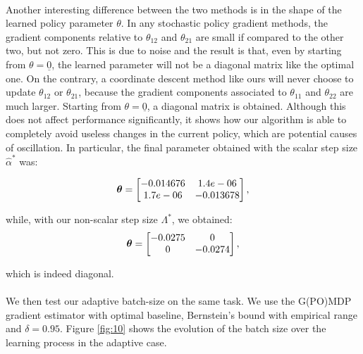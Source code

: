 \paragraph{}
Another interesting difference between the two methods is in the shape of the learned policy parameter $\theta$. In any stochastic policy gradient methods, the gradient components relative to $\theta_{12}$ and $\theta_{21}$ are small if compared to the other two, but not zero. This is due to noise and the result is that, even by starting from $\theta = \underline{0}$, the learned parameter will not be a diagonal matrix like the optimal one. On the contrary, a coordinate descent method like ours will never choose to update $\theta_{12}$ or $\theta_{21}$, because the gradient components associated to $\theta_{11}$ and $\theta_{22}$ are much larger. Starting from $\theta = \underline{0}$, a diagonal matrix is obtained.
Although this does not affect performance significantly, it shows how our algorithm is able to completely avoid useless changes in the current policy, which are potential causes of oscillation. In particular, the final parameter obtained with the scalar step size $\hat{\alpha}^*$ was:

\[
\boldsymbol{\theta} = \begin{bmatrix}
	-0.014676 & 1.4e-06 \\
	 1.7e-06  & -0.013678
	\end{bmatrix},
\]

while, with our non-scalar step size $\Lambda^*$, we obtained:
\[
\boldsymbol{\theta} = \begin{bmatrix}
	-0.0275 & 0 \\
	 0  & -0.0274
	\end{bmatrix},
\]

which is indeed diagonal.

\paragraph{}
We then test our adaptive batch-size on the same task. We use the G(PO)MDP gradient estimator with optimal baseline, Bernstein's bound with empirical range and $\delta=0.95$.
Figure \ref{fig:10} shows the evolution of the batch size over the learning process in the adaptive case.

